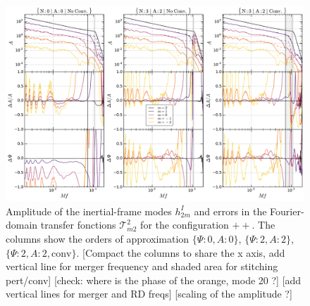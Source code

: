 \documentclass[aps,showpacs,twocolumn,
prd,superscriptaddress,nofootinbib]{revtex4-1}
\newcommand\calT{{\mathcal{T}}}
\newcommand{\SM}[1]{{\color{Red} #1}}
\begin{document}
\begin{figure}
  \centering
  \includegraphics[width=.98\linewidth]{plots/precerror_++_py.pdf}
  \caption{Amplitude of the inertial-frame modes $h^{I}_{2m}$ and errors in the Fourier-domain transfer fonctions $\calT^{2}_{m2}$ for the configuration $++$. The columns show the orders of approximation $\{\Psi:0,A:0\}$, $\{\Psi:2,A:2\}$, $\{\Psi:2,A:2,\text{conv}\}$. \SM{[Compact the columns to share the x axis, add vertical line for merger frequency and shaded area for stitching pert/conv]} \SM{[check: where is the phase of the orange, mode 20 ?]} \SM{[add vertical lines for merger and RD freqs]} \SM{[scaling of the amplitude ?]}}
  \label{fig:precerrors++}
\end{figure}
\end{document}
